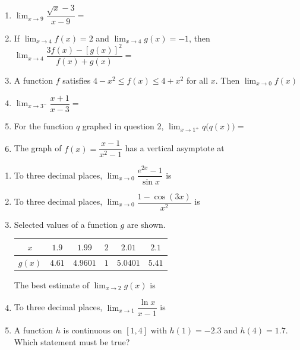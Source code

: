 \documentclass[11pt]{article}
\begin{document}
\begin{enumerate}[leftmargin=*,itemsep=0pt]
  \item $\displaystyle\lim_{x\to 9}\dfrac{\sqrt x-3}{x-9}=$

  \item If $\displaystyle\lim_{x\to 4}f(x)=2$ and $\displaystyle\lim_{x\to 4}g(x)=-1$, then $\displaystyle\lim_{x\to 4}\dfrac{3f(x)-[g(x)]^2}{f(x)+g(x)}=$

\newpage
  \item A function $f$ satisfies $4-x^2\le f(x)\le4+x^2$ for all $x$. Then $\displaystyle\lim_{x\to 0}f(x)$

  \item $\displaystyle\lim_{x\to 3^-}\dfrac{x+1}{x-3}=$

  \item For the function $q$ graphed in question 2, $\displaystyle\lim_{x\to 1^+}q\big(q(x)\big)=$

  \item The graph of $f(x)=\dfrac{x-1}{x^2-1}$ has a vertical asymptote at
\end{enumerate}

\newpage
{}
\begin{enumerate}[leftmargin=*,itemsep=0pt,start=16]
  \item To three decimal places, $\displaystyle\lim_{x\to 0}\dfrac{e^{2x}-1}{\sin x}$ is

  \item To three decimal places, $\displaystyle\lim_{x\to 0}\dfrac{1-\cos(3x)}{x^2}$ is

  \item Selected values of a function $g$ are shown.
\begin{center}\renewcommand{\arraystretch}{1.25}\begin{tabular}{|c|c|c|c|c|c|}\hline $x$ & $1.9$ & $1.99$ & $2$ & $2.01$ & $2.1$ \\ \hline $g(x)$ & $4.61$ & $4.9601$ & $1$ & $5.0401$ & $5.41$ \\ \hline\end{tabular}\end{center}
  The best estimate of $\displaystyle\lim_{x\to 2}g(x)$ is

  \item To three decimal places, $\displaystyle\lim_{x\to 1}\dfrac{\ln x}{x-1}$ is

  \item A function $h$ is continuous on $[1,4]$ with $h(1)=-2.3$ and $h(4)=1.7$. Which statement must be true?
\end{enumerate}
\end{document}

